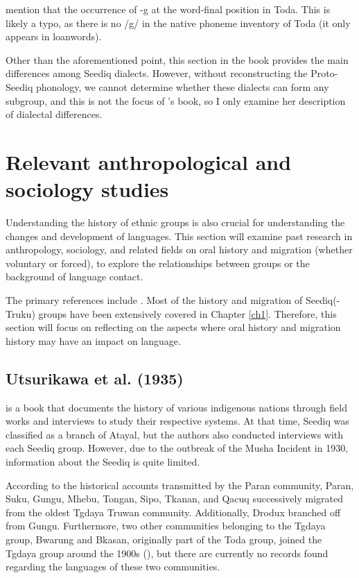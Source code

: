 \textcite[22]{Sung2018Sedgrammar} mention that the occurrence of -g at the word-final position in Toda. This is likely a typo, as there is no /g/ in the native phoneme inventory of Toda (it only appears in loanwords). 

Other than the aforementioned point, this section in the book provides the main differences among Seediq dialects. However, without reconstructing the Proto-Seediq phonology, we cannot determine whether these dialects can form any subgroup, and this is not the focus of \citeauthor{Sung2018Sedgrammar}'s book, so I only examine her description of dialectal differences.

\section{Relevant anthropological and sociology studies} \label{sec:anth_lit}

Understanding the history of ethnic groups is also crucial for understanding the changes and development of languages. This section will examine past research in anthropology, sociology, and related fields on oral history and migration (whether voluntary or forced), to explore the relationships between groups or the background of language contact. 

The primary references include \textcites{utsurikawaetal1935}{liao1977Sedtheruy}{liao1978Sedtheruy}{yap2023}. Most of the history and migration of Seediq(-Truku) groups have been extensively covered in Chapter \ref{ch1}. Therefore, this section will focus on reflecting on the aspects where oral history and migration history may have an impact on language.

\subsection{Utsurikawa et al. (1935)}

\textcite{utsurikawaetal1935} is a book that documents the history of various indigenous nations through field works and interviews to study their respective systems. At that time, Seediq was classified as a branch of Atayal, but the authors also conducted interviews with each Seediq group. However, due to the outbreak of the Musha Incident in 1930, information about the Seediq is quite limited.

According to the historical accounts transmitted by the Paran community, Paran, Suku, Gungu, Mhebu, Tongan, Sipo, Tkanan, and Qacuq successively migrated from the oldest Tgdaya Truwan community. Additionally, Drodux branched off from Gungu. Furthermore, two other communities belonging to the Tgdaya group, Bwarung and Bkasan, originally part of the Toda group, joined the Tgdaya group around the 1900s (\cite[146--157]{TengChian2023musha}), but there are currently no records found regarding the languages of these two communities.

